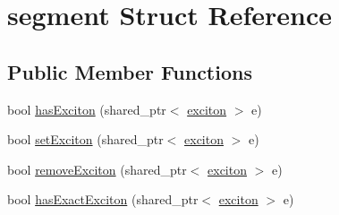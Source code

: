 \hypertarget{structsegment}{}\section{segment Struct Reference}
\label{structsegment}
\subsection*{Public Member Functions}
\begin{DoxyCompactItemize}
\item 
bool \hyperlink{structsegment_a9a55561f53863ed6210507b716a31215}{has\+Exciton} (shared\+\_\+ptr$<$ \hyperlink{classexciton}{exciton} $>$ e)
\item 
bool \hyperlink{structsegment_a2c1f73b1562ed3161189f92784d7e8b3}{set\+Exciton} (shared\+\_\+ptr$<$ \hyperlink{classexciton}{exciton} $>$ e)
\item 
bool \hyperlink{structsegment_ad6b58e2409d4f587883272d93f39594e}{remove\+Exciton} (shared\+\_\+ptr$<$ \hyperlink{classexciton}{exciton} $>$ e)
\item 
bool \hyperlink{structsegment_a6b2606d558b04d89aed43e77192cc5d7}{has\+Exact\+Exciton} (shared\+\_\+ptr$<$ \hyperlink{classexciton}{exciton} $>$ e)
\end{DoxyCompactItemize}
